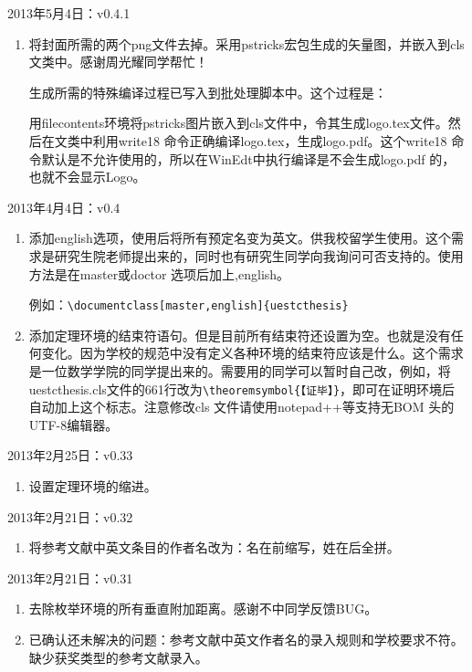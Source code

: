 \noindent
2013年5月4日：v0.4.1
\begin{enumerate}
\item 将封面所需的两个png文件去掉。采用pstricks宏包生成的矢量图，并嵌入到cls文类中。感谢周光耀同学帮忙！

生成所需的特殊编译过程已写入到批处理脚本中。这个过程是：

用filecontents环境将pstricks图片嵌入到cls文件中，令其生成logo.tex文件。然后在文类中利用write18 命令正确编译logo.tex，生成logo.pdf。这个write18 命令默认是不允许使用的，所以在WinEdt中执行编译是不会生成logo.pdf 的，也就不会显示Logo。

\end{enumerate}

\noindent
2013年4月4日：v0.4
\begin{enumerate}
\item 添加english选项，使用后将所有预定名变为英文。供我校留学生使用。这个需求是研究生院老师提出来的，同时也有研究生同学向我询问可否支持的。使用方法是在master或doctor 选项后加上,english。

    例如：\verb|\documentclass[master,english]{uestcthesis}|
\item 添加定理环境的结束符语句。但是目前所有结束符还设置为空。也就是没有任何变化。因为学校的规范中没有定义各种环境的结束符应该是什么。这个需求是一位数学学院的同学提出来的。需要用的同学可以暂时自己改，例如，将uestcthesis.cls文件的661行改为\verb|\theoremsymbol{【证毕】}|，即可在证明环境后自动加上这个标志。注意修改cls 文件请使用notepad++等支持无BOM 头的UTF-8编辑器。
\end{enumerate}

\noindent
2013年2月25日：v0.33
\begin{enumerate}
\item 设置定理环境的缩进。
\end{enumerate}


\noindent
2013年2月21日：v0.32
\begin{enumerate}
\item 将参考文献中英文条目的作者名改为：名在前缩写，姓在后全拼。
\end{enumerate}

\noindent
2013年2月21日：v0.31
\begin{enumerate}
\item 去除枚举环境的所有垂直附加距离。感谢不中同学反馈BUG。
\item 已确认还未解决的问题：参考文献中英文作者名的录入规则和学校要求不符。缺少获奖类型的参考文献录入。
\end{enumerate}

